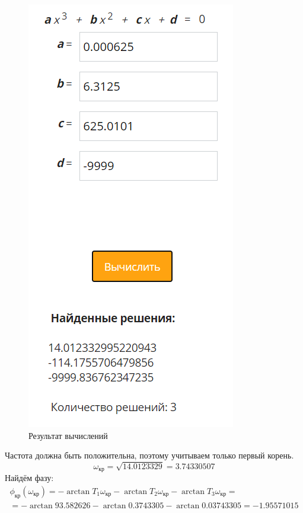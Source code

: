 \documentclass[12pt]{article}
\begin{document}
\begin{figure}[h!]
     \centering
    \includegraphics[scale=1]{аналитически.png}
    \caption{Результат вычислений}
\end{figure} 
\newpage
Частота должна быть положительна, поэтому учитываем только первый корень. 
\begin{equation}
    \omega_{кр} = \sqrt{14.0123329} = 3.74330507
\end{equation}
Найдём фазу: 
\begin{equation}
\begin{gathered}
    \phi_{кр}(\omega_{кр}) = -\arctan{T_1\omega_{кр}} -\arctan{T_2\omega_{кр}} -\arctan{T_3\omega_{кр}} = \\
    = -\arctan{93.582626} -\arctan{0.3743305} - \arctan{0.03743305} = -1.95571015
\end{gathered}
\end{equation}
\end{document}
